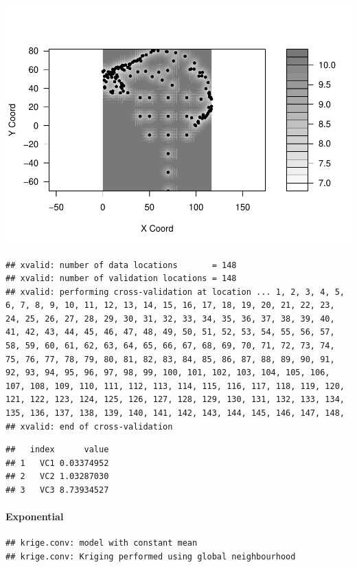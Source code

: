 \documentclass[
]{article}
\begin{document}
\includegraphics{Assignment_1_files/figure-latex/unnamed-chunk-52-1.pdf}

\begin{verbatim}
## xvalid: number of data locations       = 148
## xvalid: number of validation locations = 148
## xvalid: performing cross-validation at location ... 1, 2, 3, 4, 5, 6, 7, 8, 9, 10, 11, 12, 13, 14, 15, 16, 17, 18, 19, 20, 21, 22, 23, 24, 25, 26, 27, 28, 29, 30, 31, 32, 33, 34, 35, 36, 37, 38, 39, 40, 41, 42, 43, 44, 45, 46, 47, 48, 49, 50, 51, 52, 53, 54, 55, 56, 57, 58, 59, 60, 61, 62, 63, 64, 65, 66, 67, 68, 69, 70, 71, 72, 73, 74, 75, 76, 77, 78, 79, 80, 81, 82, 83, 84, 85, 86, 87, 88, 89, 90, 91, 92, 93, 94, 95, 96, 97, 98, 99, 100, 101, 102, 103, 104, 105, 106, 107, 108, 109, 110, 111, 112, 113, 114, 115, 116, 117, 118, 119, 120, 121, 122, 123, 124, 125, 126, 127, 128, 129, 130, 131, 132, 133, 134, 135, 136, 137, 138, 139, 140, 141, 142, 143, 144, 145, 146, 147, 148, 
## xvalid: end of cross-validation
\end{verbatim}

\begin{verbatim}
##   index      value
## 1   VC1 0.03374952
## 2   VC2 1.03287030
## 3   VC3 8.73934527
\end{verbatim}

\hypertarget{exponential-2}{%
\paragraph{Exponential}\label{exponential-2}}

\begin{verbatim}
## krige.conv: model with constant mean
## krige.conv: Kriging performed using global neighbourhood
\end{verbatim}
\end{document}

